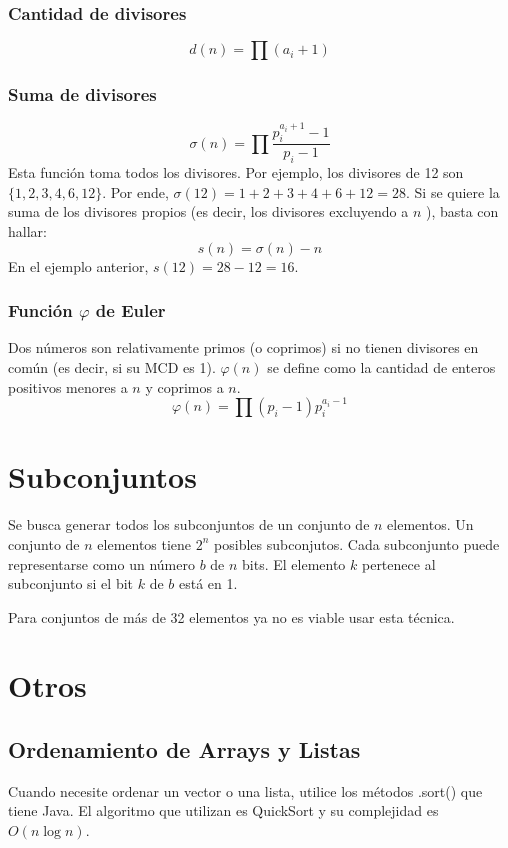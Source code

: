 \documentclass{article}
\begin{document}
\begin{multicols}{2}
		\subsubsection{Cantidad de divisores}
		\[ d(n) = \prod (a_{i} + 1) \]
		
		\subsubsection{Suma de divisores}
		\[ 
			\sigma (n) = \prod \frac{p_{i}^{a_{i} + 1} - 1}{p_{i} - 1}
		\]
		Esta función toma todos los divisores. Por ejemplo, los divisores de 12 son \( \{1, 2, 3, 4, 6, 12\} \). Por ende, \( \sigma(12) = 1+2+3+4+6+12 = 28 \). Si se quiere la suma de los divisores propios (es decir, los divisores excluyendo a \( n \) ), basta con hallar:
		\[ 
			s (n) = \sigma (n) - n
		\]		
		En el ejemplo anterior, \( s (12) = 28-12 = 16 \).
		
		\subsubsection{Función $\varphi$ de Euler}
		Dos números son relativamente primos (o coprimos) si no tienen divisores en común (es decir, si su MCD es 1). \( \varphi (n) \) se define como la cantidad de enteros positivos menores a \( n \) y coprimos a \( n \). 
		\[ 
			\varphi (n) = \prod (p_{i} - 1) p_{i}^{a_{i}-1}
		\]		
		
\section{Subconjuntos}
Se busca generar todos los subconjuntos de un conjunto de \( n \) elementos. Un conjunto de \( n \) elementos tiene \( 2^{n} \) posibles subconjutos. Cada subconjunto puede representarse como un número \( b \) de \( n \) bits. El elemento \( k \) pertenece al subconjunto si el bit \( k \) de \( b \) está en 1.

Para conjuntos de más de 32 elementos ya no es viable usar esta técnica.

		
\section{Otros}
	\subsection{Ordenamiento de Arrays y Listas}
	Cuando necesite ordenar un vector o una lista, utilice los métodos .sort() que tiene 		Java. El algoritmo que utilizan es QuickSort y su complejidad es \( O(n\log n) \).	
	
	

\end{multicols}
\end{document}
